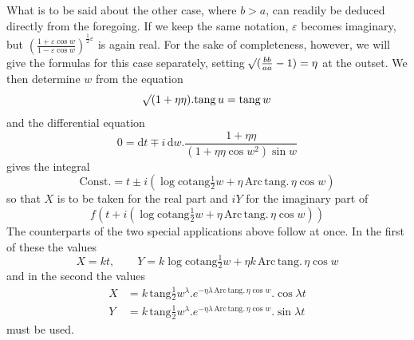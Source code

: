 What is to be said about the other case, where \(b>a\), can readily be deduced directly from the foregoing. If we keep the same
notation, \(\varepsilon\) becomes imaginary, but \((\frac{1+\varepsilon\cos w}{1-\varepsilon\cos w})^{\frac{1}{2}\varepsilon}\) is again real. For the sake of completeness, however, we will give the formulas for this case separately, setting \(\mathord{{}^{}\!\surd}(\frac{bb}{aa}-1)=\eta\) at the outset. We then determine \(w\) from the equation
\[
\mathord{{}^{}\!\surd}(1+\eta\eta)\mathord{.}\mathrm{tang}\,u=\mathrm{tang}\,w
\]
\noindent and the differential equation
\[
0=\mathrm{d}t\mp i\,\mathrm{d}w\mathord{.}\frac{1+\eta\eta}{(1+\eta\eta\cos w^2)\sin w}
\]
\noindent gives the integral
\[
\text{Const.}=t\pm i(\log\mathrm{cotang}\tfrac{1}{2}w+\eta\,\mathrm{Arc}\,\mathrm{tang}.\,\eta\cos w)
\]
\noindent so that \(X\) is to be taken for the real part and \(iY\) for the imaginary part of
\[
f(t+i(\log\mathrm{cotang}\tfrac{1}{2}w+\eta\,\mathrm{Arc}\,\mathrm{tang}.\,\eta\cos w))
\]
\noindent The counterparts of the two special applications above follow at once. In the first of these the values
\[
X=kt,\qquad Y=k\log\mathrm{cotang}\tfrac{1}{2}w+\eta k\,\mathrm{Arc}\,\mathrm{tang}.\,\eta\cos w
\]
\noindent and in the second the values
\[
\begin{aligned}
X&=k\,\mathrm{tang}\tfrac{1}{2}w^{\lambda}\mathord{.}e^{-\eta\lambda\,\mathrm{Arc}\,\mathrm{tang}.\,\eta\cos w}\mathord{.}\cos\lambda t\\
Y&=k\,\mathrm{tang}\tfrac{1}{2}w^{\lambda}\mathord{.}e^{-\eta\lambda\,\mathrm{Arc}\,\mathrm{tang}.\,\eta\cos w}\mathord{.}\sin\lambda t
\end{aligned}
\]
\noindent must be used.

